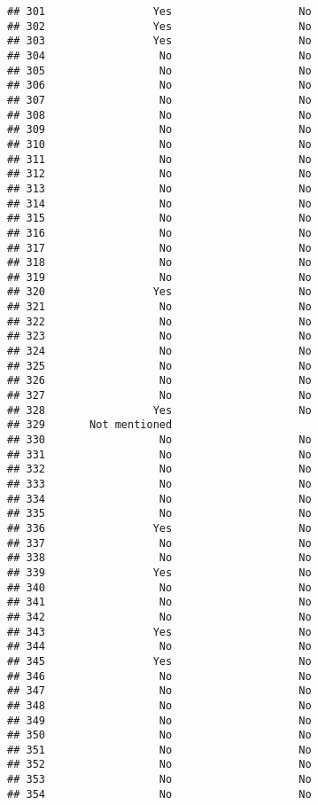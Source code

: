 \documentclass[
]{article}
\begin{document}
\begin{verbatim}
## 301                 Yes                    No
## 302                 Yes                    No
## 303                 Yes                    No
## 304                  No                    No
## 305                  No                    No
## 306                  No                    No
## 307                  No                    No
## 308                  No                    No
## 309                  No                    No
## 310                  No                    No
## 311                  No                    No
## 312                  No                    No
## 313                  No                    No
## 314                  No                    No
## 315                  No                    No
## 316                  No                    No
## 317                  No                    No
## 318                  No                    No
## 319                  No                    No
## 320                 Yes                    No
## 321                  No                    No
## 322                  No                    No
## 323                  No                    No
## 324                  No                    No
## 325                  No                    No
## 326                  No                    No
## 327                  No                    No
## 328                 Yes                    No
## 329       Not mentioned                      
## 330                  No                    No
## 331                  No                    No
## 332                  No                    No
## 333                  No                    No
## 334                  No                    No
## 335                  No                    No
## 336                 Yes                    No
## 337                  No                    No
## 338                  No                    No
## 339                 Yes                    No
## 340                  No                    No
## 341                  No                    No
## 342                  No                    No
## 343                 Yes                    No
## 344                  No                    No
## 345                 Yes                    No
## 346                  No                    No
## 347                  No                    No
## 348                  No                    No
## 349                  No                    No
## 350                  No                    No
## 351                  No                    No
## 352                  No                    No
## 353                  No                    No
## 354                  No                    No

\end{verbatim}
\end{document}
